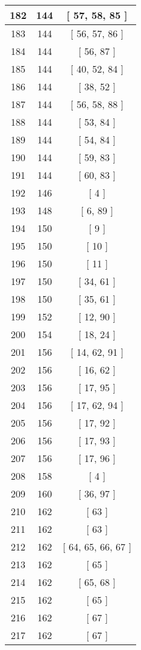 \begin{center}
\begin{longtable}[H]{|| c c c ||}
\hline
182 & 144 & [ 57, 58, 85 ] \\ 
\hline
183 & 144 & [ 56, 57, 86 ] \\ 
\hline
184 & 144 & [ 56, 87 ] \\ 
\hline
185 & 144 & [ 40, 52, 84 ] \\ 
\hline
186 & 144 & [ 38, 52 ] \\ 
\hline
187 & 144 & [ 56, 58, 88 ] \\ 
\hline
188 & 144 & [ 53, 84 ] \\ 
\hline
189 & 144 & [ 54, 84 ] \\ 
\hline
190 & 144 & [ 59, 83 ] \\ 
\hline
191 & 144 & [ 60, 83 ] \\ 
\hline
192 & 146 & [ 4 ] \\ 
\hline
193 & 148 & [ 6, 89 ] \\ 
\hline
194 & 150 & [ 9 ] \\ 
\hline
195 & 150 & [ 10 ] \\ 
\hline
196 & 150 & [ 11 ] \\ 
\hline
197 & 150 & [ 34, 61 ] \\ 
\hline
198 & 150 & [ 35, 61 ] \\ 
\hline
199 & 152 & [ 12, 90 ] \\ 
\hline
200 & 154 & [ 18, 24 ] \\ 
\hline
201 & 156 & [ 14, 62, 91 ] \\ 
\hline
202 & 156 & [ 16, 62 ] \\ 
\hline
203 & 156 & [ 17, 95 ] \\ 
\hline
204 & 156 & [ 17, 62, 94 ] \\ 
\hline
205 & 156 & [ 17, 92 ] \\ 
\hline
206 & 156 & [ 17, 93 ] \\ 
\hline
207 & 156 & [ 17, 96 ] \\ 
\hline
208 & 158 & [ 4 ] \\ 
\hline
209 & 160 & [ 36, 97 ] \\ 
\hline
210 & 162 & [ 63 ] \\ 
\hline
211 & 162 & [ 63 ] \\ 
\hline
212 & 162 & [ 64, 65, 66, 67 ] \\ 
\hline
213 & 162 & [ 65 ] \\ 
\hline
214 & 162 & [ 65, 68 ] \\ 
\hline
215 & 162 & [ 65 ] \\ 
\hline
216 & 162 & [ 67 ] \\ 
\hline
217 & 162 & [ 67 ] \\ 

\end{longtable}
\end{center}
